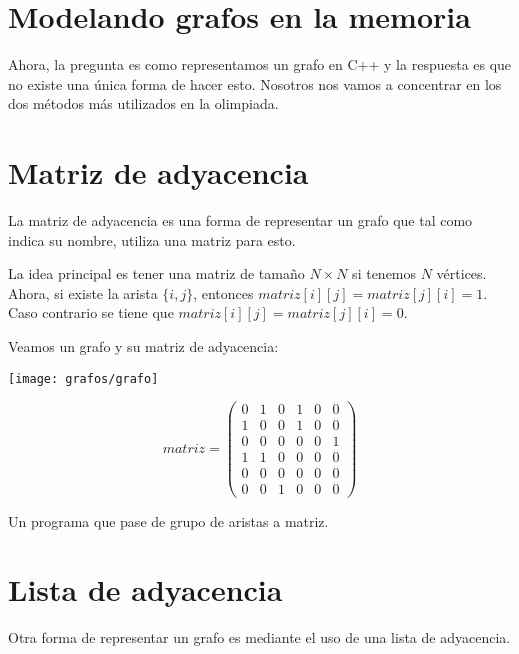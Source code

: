 \section{Modelando grafos en la memoria}

Ahora, la pregunta es como representamos un grafo en C++ y la respuesta es que no existe una única forma de hacer esto. Nosotros nos vamos a concentrar en los dos métodos más utilizados en la olimpiada.


\section{Matriz de adyacencia}

La matriz de adyacencia es una forma de representar un grafo que tal como indica su nombre, utiliza una matriz para esto.

La idea principal es tener una matriz de tamaño \(N\times N\) si tenemos \(N\) vértices. Ahora, si existe la arista \(\{i, j\}\), entonces \(matriz[i][j]=matriz[j][i]=1\). Caso contrario se tiene que \(matriz[i][j]=matriz[j][i]=0\).

Veamos un grafo y su matriz de adyacencia:

\begin{center}
	\texttt{[image: grafos/grafo]}
\end{center}
\begin{large}
	\begin{displaymath}	
		matriz = \begin{pmatrix}
			0 & 1 & 0 & 1 & 0 & 0\\
			1 & 0 & 0 & 1 & 0 & 0\\
			0 & 0 & 0 & 0 & 0 & 1\\
			1 & 1 & 0 & 0 & 0 & 0\\
			0 & 0 & 0 & 0 & 0 & 0\\
			0 & 0 & 1 & 0 & 0 & 0
		\end{pmatrix}
	\end{displaymath}
\end{large}

\begin{exercise}
	Un programa que pase de grupo de aristas a matriz.
\end{exercise}

\section{Lista de adyacencia}
Otra forma de representar un grafo es mediante el uso de una lista de adyacencia.

